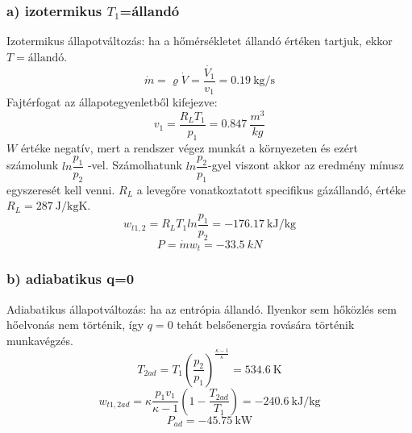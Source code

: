\subsubsection{a) izotermikus $T_1$=állandó}
Izotermikus állapotváltozás: ha a hőmérsékletet állandó értéken tartjuk, ekkor $T=\textrm{állandó}$.
\begin{equation}
\dot{m}=\varrho \dot{V}=\frac{\dot{V_1}}{v_1}=\SI{0,19}{\kilogram\per\second}
\end{equation}
Fajtérfogat az állapotegyenletből kifejezve:
\begin{equation}
v_1=\frac{R_L T_1}{p_1}=\SI{0,847}{\frac{m^3}{kg}}
\end{equation}
\noindent $W$ értéke negatív, mert a rendszer végez munkát a környezeten és ezért számolunk $ln\dfrac{p_1}{p_2}$ -vel. Számolhatunk $ln\dfrac{p_2}{p_1}$-gyel viszont akkor az eredmény mínusz egyszeresét kell venni. $R_L$ a levegőre vonatkoztatott specifikus gázállandó, értéke $R_L=\SI{287}{\joule\per\kilogram\kelvin}$.
\begin{equation}
w_{t1,2}=R_LT_1ln\frac{p_1}{p_2}=\SI{-176,17}{\kilo\joule\per\kilogram}
\end{equation}
\begin{equation}
P=\dot{m}w_t=\SI{-33,5}{kN}
\end{equation}

\subsubsection{b) adiabatikus q=0}
Adiabatikus állapotváltozás: ha az entrópia állandó. Ilyenkor sem hőközlés sem hőelvonás nem történik, így $q=0$ tehát belsőenergia rovására történik munkavégzés.
\begin{equation}
T_{2ad}=T_1\left(\frac{p_2}{p_1}\right)^\frac{\kappa-1}{\kappa}=\SI{534,6}{\kelvin}
\end{equation}
\begin{equation}
w_{t1,2ad}=\kappa\frac{p_1v_1}{\kappa-1}\left(1-\frac{T_{2ad}}{T_1}\right)=\SI{-240,6}{\kilo\joule\per\kilogram}
\end{equation}
\begin{equation}
P_{ad}=\SI{-45,75}{\kilo\watt}
\end{equation}


